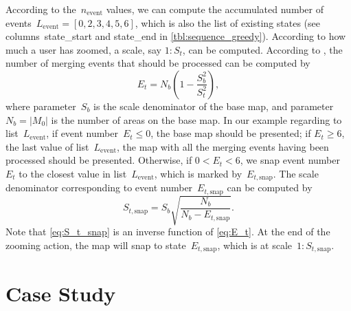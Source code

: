\documentclass[ijgi,article,submit,moreauthors,pdftex]{Definitions/mdpi}
\begin{document}
According to the~$n_\mathrm{event}$ values,
we can compute the accumulated number of events~$L_\mathrm{event} = 
[0, 2, 3, 4, 5, 6]$,
which is also the list of existing states
(see columns~state\_start and state\_end in \tbl\ref{tbl:sequence_greedy}).
According to how much a user has zoomed,
a scale, say $1:S_t$, can be computed.
According to \citet{Huang2016Webmap},
the number of merging events that should be processed can be computed by
\begin{equation}
\label{eq:E_t}
E_t = N_b \left(1-\frac{S^2_b}{S^2_t}\right),
\end{equation}
where parameter~$S_b$ is the scale denominator of the base map,
and parameter~$N_b = |M_0|$ is the number of areas on the base map.
In our example regarding to list~$L_\mathrm{event}$,
if event number~$E_t \le 0$, the base map should be presented;
if $E_t \ge 6$, the last value of list~$L_\mathrm{event}$,
the map with all the merging events having been processed
should be presented.
Otherwise, if $0<E_t < 6$, we snap event number~$E_t$ 
to the closest value in list~$L_\mathrm{event}$,
which is marked by~$E_{t,\mathrm{snap}}$.
The scale denominator corresponding to event number~$E_{t,\mathrm{snap}}$
can be computed by 
\begin{equation}
\label{eq:S_t_snap}
S_{t,\mathrm{snap}} = S_b \sqrt{\frac{N_b}{N_b-E_{t,\mathrm{snap}}}}.
\end{equation}
Note that \eq\ref{eq:S_t_snap} is an inverse function of \eq\ref{eq:E_t}.
At the end of the zooming action, 
the map will snap to state~$E_{t,\mathrm{snap}}$,
which is at scale~$1:S_{t,\mathrm{snap}}$.




\section{Case Study}
\label{sec:case_study}
\end{document}
